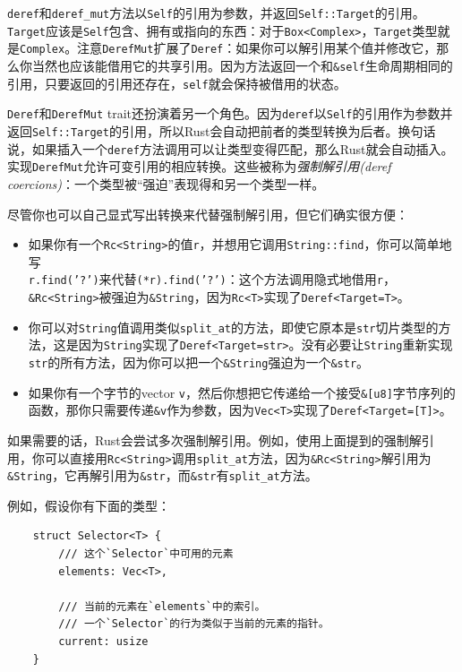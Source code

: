 \texttt{deref}和\texttt{deref\_mut}方法以\texttt{Self}的引用为参数，并返回\texttt{Self::Target}的引用。\texttt{Target}应该是\texttt{Self}包含、拥有或指向的东西：对于\texttt{Box<Complex>}，\texttt{Target}类型就是\texttt{Complex}。注意\texttt{DerefMut}扩展了\texttt{Deref}：如果你可以解引用某个值并修改它，那么你当然也应该能借用它的共享引用。因为方法返回一个和\texttt{\&self}生命周期相同的引用，只要返回的引用还存在，\texttt{self}就会保持被借用的状态。

\texttt{Deref}和\texttt{DerefMut} trait还扮演着另一个角色。因为\texttt{deref}以\texttt{Self}的引用作为参数并返回\texttt{Self::Target}的引用，所以Rust会自动把前者的类型转换为后者。换句话说，如果插入一个\texttt{deref}方法调用可以让类型变得匹配，那么Rust就会自动插入。实现\texttt{DerefMut}允许可变引用的相应转换。这些被称为\emph{强制解引用(deref coercions)}：一个类型被“强迫”表现得和另一个类型一样。

尽管你也可以自己显式写出转换来代替强制解引用，但它们确实很方便：
\begin{itemize}
    \item 如果你有一个\texttt{Rc<String>}的值\texttt{r}，并想用它调用\texttt{String::find}，你可以简单地写\\
    \texttt{r.find('?')}来代替\texttt{(*r).find('?')}：这个方法调用隐式地借用\texttt{r}，\texttt{\&Rc<String>}被强迫为\texttt{\&String}，因为\texttt{Rc<T>}实现了\texttt{Deref<Target=T>}。
    \item 你可以对\texttt{String}值调用类似\texttt{split\_at}的方法，即使它原本是\texttt{str}切片类型的方法，这是因为\texttt{String}实现了\texttt{Deref<Target=str>}。没有必要让\texttt{String}重新实现\texttt{str}的所有方法，因为你可以把一个\texttt{\&String}强迫为一个\texttt{\&str}。
    \item 如果你有一个字节的vector \texttt{v}，然后你想把它传递给一个接受\texttt{\&[u8]}字节序列的函数，那你只需要传递\texttt{\&v}作为参数，因为\texttt{Vec<T>}实现了\texttt{Deref<Target=[T]>}。
\end{itemize}

如果需要的话，Rust会尝试多次强制解引用。例如，使用上面提到的强制解引用，你可以直接用\texttt{Rc<String>}调用\texttt{split\_at}方法，因为\texttt{\&Rc<String>}解引用为\texttt{\&String}，它再解引用为\texttt{\&str}，而\texttt{\&str}有\texttt{split\_at}方法。

例如，假设你有下面的类型：
\begin{verbatim}
    struct Selector<T> {
        /// 这个`Selector`中可用的元素
        elements: Vec<T>,

        /// 当前的元素在`elements`中的索引。
        /// 一个`Selector`的行为类似于当前的元素的指针。
        current: usize
    }
\end{verbatim}

